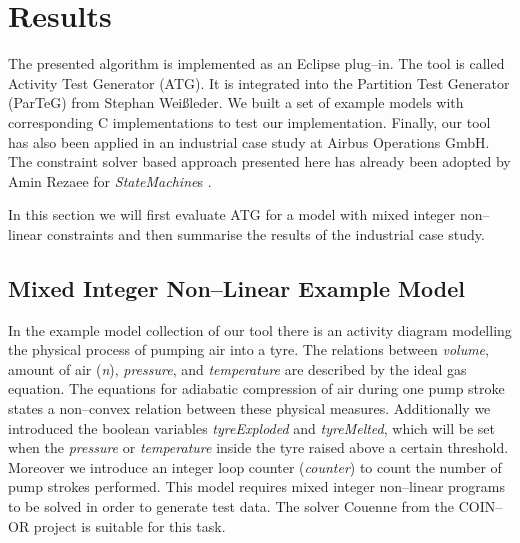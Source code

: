 \documentclass[runningheads,a4paper]{llncs}%
\newcommand{\UMLType}[1]{\textsf{\textit{#1}}} %
\newcommand{\OCLVar}[1]{\textit{#1}}
\begin{document}
\section{Results}%
The presented algorithm is implemented as an Eclipse plug--in. The tool is called Activity Test Generator (ATG). It is integrated into the Partition Test Generator (ParTeG) \cite{PartegWebsite} from Stephan Wei{\ss}leder. We built a set of example models with corresponding C implementations to test our implementation. Finally, our tool has also been applied in an industrial case study at Airbus Operations GmbH. The constraint solver based approach presented here has already been adopted by Amin Rezaee for \UMLType{StateMachine}s \cite{Rezaee2014ANew}.

In this section we will first evaluate ATG for a model with mixed integer non--linear constraints and then summarise the results of the industrial case study.%
\subsection{Mixed Integer Non--Linear Example Model}
\label{sec:exampleModelNonConvex}
In the example model collection of our tool there is an activity diagram modelling the physical process of pumping air into a tyre. The relations between \OCLVar{volume}, amount of air (\OCLVar{n}), \OCLVar{pressure}, and \OCLVar{temperature} are described by the ideal gas equation. The equations for adiabatic compression of air during one pump stroke states a non--convex relation between these physical measures. Additionally we introduced the boolean variables \OCLVar{tyreExploded} and \OCLVar{tyreMelted}, which will be set when the \OCLVar{pressure} or \OCLVar{temperature} inside the tyre raised above a certain threshold. Moreover we introduce an integer loop counter (\OCLVar{counter}) to count the number of pump strokes performed. This model requires mixed integer non--linear programs to be solved in order to generate test data. The solver Couenne \cite{Belotti09couenne} from the COIN--OR project is suitable for this task.%
\end{document}
